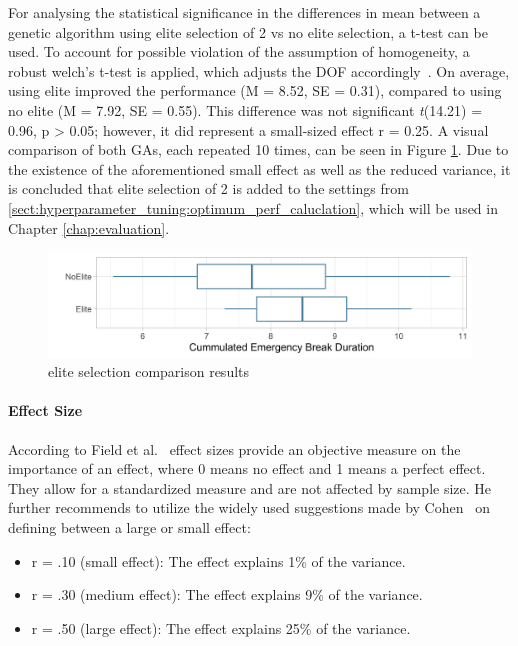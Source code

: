 For analysing the statistical significance in the differences in mean between a genetic algorithm using elite selection of 2 vs no elite selection, a t-test can be used. To account for possible violation of the assumption of homogeneity, a robust welch's t-test is applied, which adjusts the DOF accordingly~\cite{field_discovering_2012}. On average, using elite improved the performance (M = 8.52, SE = 0.31), compared to using no elite (M = 7.92, SE = 0.55). This difference was not significant \textit{t}(14.21) = 0.96, p > 0.05; however, it did represent a small-sized effect r = 0.25. A visual comparison of both GAs, each repeated 10 times, can be seen in Figure \ref{fig:hyperparameter_tuning:elite_comparison}. Due to the existence of the aforementioned small effect as well as the reduced variance, it is concluded that elite selection of 2 is added to the settings from \ref{sect:hyperparameter_tuning:optimum_perf_caluclation}, which will be used in Chapter \ref{chap:evaluation}.

\begin{figure}[ht] 
	\includegraphics[width=1\linewidth]{simulations/evaluation/plots/elite_vs_no_elite}
	\caption{elite selection comparison results}
	\label{fig:hyperparameter_tuning:elite_comparison}
\end{figure}

\paragraph{Effect Size}
According to Field et al.~\cite{field_discovering_2012} effect sizes provide an objective measure on the importance of an effect, where 0 means no effect and 1 means a perfect effect. They allow for a standardized measure and are not affected by sample size. He further recommends to utilize the widely used suggestions made by Cohen~\cite{cohen_statistical_1988, cohen_power_1992} on defining between a large or small effect:

\begin{itemize}
	\item r = .10 (small effect): The effect explains 1\% of the variance. 
	\item r = .30 (medium effect): The effect explains 9\% of the variance. 
	\item r = .50 (large effect): The effect explains 25\% of the variance.
\end{itemize} 

